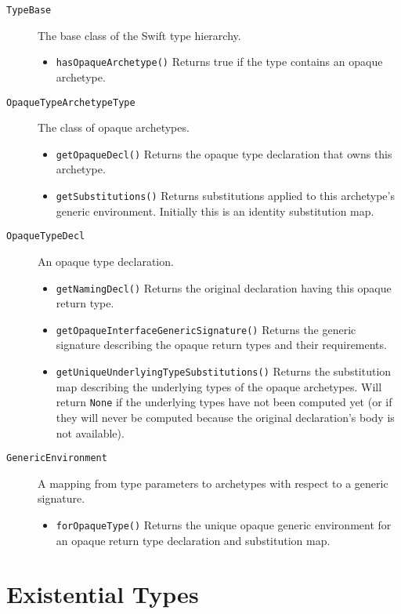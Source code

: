 \documentclass[a4paper,headsepline,bibliography=totoc,toc=flat,fleqn,twoside=semi]{scrbook}
\theoremstyle{definition}
\theoremstyle{definition}
\theoremstyle{definition}
\begin{document}
\begin{description}
\item[\texttt{TypeBase}] The base class of the Swift type hierarchy.
\begin{itemize}
\item \texttt{hasOpaqueArchetype()} Returns true if the type contains an opaque archetype.
\end{itemize}
\item[\texttt{OpaqueTypeArchetypeType}] The class of opaque archetypes.
\begin{itemize}
\item \texttt{getOpaqueDecl()} Returns the opaque type declaration that owns this archetype.
\item \texttt{getSubstitutions()} Returns substitutions applied to this archetype's generic environment. Initially this is an identity substitution map.
\end{itemize}
\item[\texttt{OpaqueTypeDecl}] An opaque type declaration.
\begin{itemize}
\item \texttt{getNamingDecl()} Returns the original declaration having this opaque return type.
\item \texttt{getOpaqueInterfaceGenericSignature()} Returns the generic signature describing the opaque return types and their requirements.
\item \texttt{getUniqueUnderlyingTypeSubstitutions()} Returns the substitution map describing the underlying types of the opaque archetypes. Will return \texttt{None} if the underlying types have not been computed yet (or if they will never be computed because the original declaration's body is not available).
\end{itemize}

\item[\texttt{GenericEnvironment}] A mapping from type parameters to archetypes with respect to a generic signature.
\begin{itemize}
\item \texttt{forOpaqueType()} Returns the unique opaque generic environment for an opaque return type declaration and substitution map.
\end{itemize}

\end{description}

\fi

\chapter{Existential Types}\label{existentialtypes}
\end{document}
